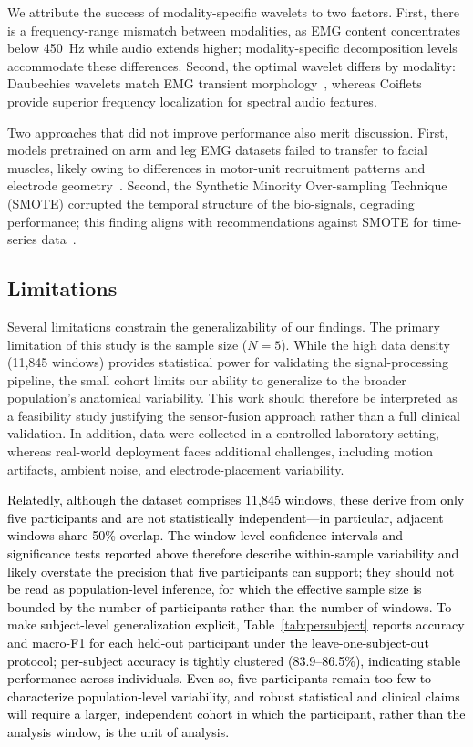 \documentclass[pdflatex,sn-nature,iicol]{sn-jnl}
\newcommand{\rev}[1]{\textcolor{black}{#1}}
\begin{document}
We attribute the success of modality-specific wavelets to two factors. First, there is a frequency-range mismatch between modalities, as EMG content concentrates below 450~Hz while audio extends higher; modality-specific decomposition levels accommodate these differences. Second, the optimal wavelet differs by modality: Daubechies wavelets match EMG transient morphology~\cite{englehart2003robust}, whereas Coiflets provide superior frequency localization for spectral audio features.

Two approaches that did not improve performance also merit discussion. First, models pretrained on arm and leg EMG datasets failed to transfer to facial muscles, likely owing to differences in motor-unit recruitment patterns and electrode geometry~\cite{jiang2012myoelectric}. Second, the Synthetic Minority Over-sampling Technique (SMOTE) corrupted the temporal structure of the bio-signals, degrading performance; this finding aligns with recommendations against SMOTE for time-series data~\cite{johnson2019survey}.

\subsection{Limitations}
Several limitations constrain the generalizability of our findings. The primary limitation of this study is the sample size ($N=5$). While the high data density (11,845 windows) provides statistical power for validating the signal-processing pipeline, the small cohort limits our ability to generalize to the broader population's anatomical variability. This work should therefore be interpreted as a feasibility study justifying the sensor-fusion approach rather than a full clinical validation. In addition, data were collected in a controlled laboratory setting, whereas real-world deployment faces additional challenges, including motion artifacts, ambient noise, and electrode-placement variability.

\rev{Relatedly, although the dataset comprises 11{,}845 windows, these derive from only five participants and are not statistically independent---in particular, adjacent windows share 50\% overlap. The window-level confidence intervals and significance tests reported above therefore describe within-sample variability and likely overstate the precision that five participants can support; they should not be read as population-level inference, for which the effective sample size is bounded by the number of participants rather than the number of windows. To make subject-level generalization explicit, Table~\ref{tab:persubject} reports accuracy and macro-F1 for each held-out participant under the leave-one-subject-out protocol; per-subject accuracy is tightly clustered (83.9--86.5\%), indicating stable performance across individuals. Even so, five participants remain too few to characterize population-level variability, and robust statistical and clinical claims will require a larger, independent cohort in which the participant, rather than the analysis window, is the unit of analysis.}
\end{document}
